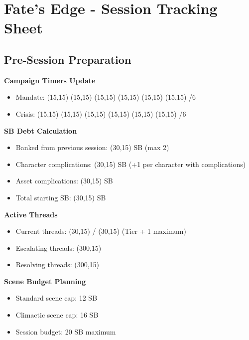 \documentclass[11pt,letterpaper]{article}
\begin{document}
\section*{Fate's Edge - Session Tracking Sheet}

\subsection{Pre-Session Preparation}

\noindent\textbf{Campaign Timers Update}
\begin{itemize}[leftmargin=*]
    \item Mandate: \framebox(15,15){} \framebox(15,15){} \framebox(15,15){} \framebox(15,15){} \framebox(15,15){} \framebox(15,15){} /6
    \item Crisis: \framebox(15,15){} \framebox(15,15){} \framebox(15,15){} \framebox(15,15){} \framebox(15,15){} \framebox(15,15){} /6
\end{itemize}

\vspace{0.3cm}

\noindent\textbf{SB Debt Calculation}
\begin{itemize}[leftmargin=*]
    \item Banked from previous session: \framebox(30,15){} SB (max 2)
    \item Character complications: \framebox(30,15){} SB (+1 per character with complications)
    \item Asset complications: \framebox(30,15){} SB
    \item Total starting SB: \framebox(30,15){} SB
\end{itemize}

\vspace{0.3cm}

\noindent\textbf{Active Threads}
\begin{itemize}[leftmargin=*]
    \item Current threads: \framebox(30,15){} / \framebox(30,15){} (Tier + 1 maximum)
    \item Escalating threads: \framebox(300,15){} 
    \item Resolving threads: \framebox(300,15){}
\end{itemize}

\vspace{0.3cm}

\noindent\textbf{Scene Budget Planning}
\begin{itemize}[leftmargin=*]
    \item Standard scene cap: 12 SB
    \item Climactic scene cap: 16 SB
    \item Session budget: 20 SB maximum
\end{itemize}
\end{document}
